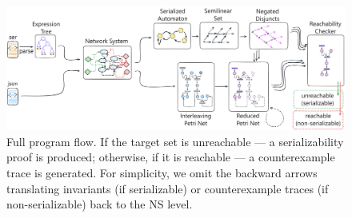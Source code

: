 \begin{figure}[!htbp]
	\centering
	\includegraphics[width=1.0\textwidth]{plots/full_program_flow.pdf}
	\caption{Full program flow. If the target set is unreachable --- a serializability proof is produced; otherwise, if it is reachable --- a counterexample trace is generated.
	For simplicity, we omit the backward arrows translating invariants (if serializable) or counterexample traces (if non-serializable) back to the NS level.}
	\label{fig:full_program_flow}
\end{figure}




